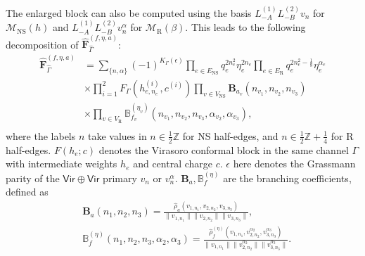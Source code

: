 \documentclass[12pt]{article}
\def\ie{\begin{equation}\begin{aligned}}
\def\fe{\end{aligned}\end{equation}}
\def\NS{\mathrm{NS}}
\def\R{\mathrm{R}}
\begin{document}
The enlarged block can also be computed using the basis $L_{-A}^{(1)}L_{-B}^{(2)}v_n$ for $\mathcal{M}_{\NS}(h)$ and $L_{-A}^{(1)}L_{-B}^{(2)}v_n^\alpha$ for $\mathcal{M}_{\R}(\beta)$. This leads to the following decomposition of $\widehat{\mathbf{F}}_{\hat{\Gamma}}^{(f, \eta, a)}$:
\ie
\widehat{\mathbf{F}}_{\hat{\Gamma}}^{(f, \eta, a)} &= \sum_{\{n,\alpha\}} (-1)^{K_{\Gamma}(\epsilon)} \prod_{e\in E_\NS} q_e^{2n_e^2}\eta_e^{2n_e} \prod_{e\in E_\R} q_e^{2n_e^2-\frac{1}{8}}\eta_e^{\alpha_e}\\
&\times \prod_{i=1}^2 F_{\Gamma}(h_{e,n_e}^{(i)}, c^{(i)}) \prod_{v\in V_\NS} \mathbf{B}_{a_v}(n_{v_1},n_{v_2},n_{v_3})\\
&\times \prod_{v\in V_\R} \mathbb{B}_{f_v}^{(\eta_v)}(n_{v_1},n_{v_2},n_{v_3},\alpha_{v_2},\alpha_{v_3}),\\
\fe
where the labels $n$ take values in $n\in \frac{1}{2}\mathbb{Z}$ for NS half-edges, and $n\in \frac{1}{2}\mathbb{Z}+\frac{1}{4}$ for R half-edges. $F(h_e; c)$ denotes the Virasoro conformal block in the same channel $\Gamma$ with intermediate weights $h_{e}$ and central charge $c$. $\epsilon$ here denotes the Grassmann parity of the $\mathsf{Vir}\oplus \mathsf{Vir}$ primary $v_n$ or $v_n^\alpha$. $\mathbf{B}_a, \mathbb{B}^{(\eta)}_f$ are the branching coefficients, defined as
\ie \label{branch}
&\mathbf{B}_a(n_1, n_2, n_3) = \frac{\hat{\rho}_a(v_{1,n_1}, v_{2,n_2}, v_{3,n_3})}{\|v_{1,n_1}\|\|v_{2,n_2}\|\|v_{3,n_3}\|},\\
&\mathbb{B}^{(\eta)}_f(n_1, n_2, n_3,\alpha_2, \alpha_3) = \frac{\hat{\rho}_f^{(\eta)}(v_{1,n_1}, v_{2,n_2}^{\alpha_2}, v_{3,n_3}^{\alpha_3})}{\|v_{1,n_1}\|\|v_{2,n_2}^{\alpha_2}\|\|v_{3,n_3}^{\alpha_3}\|}.
\fe
\end{document}
